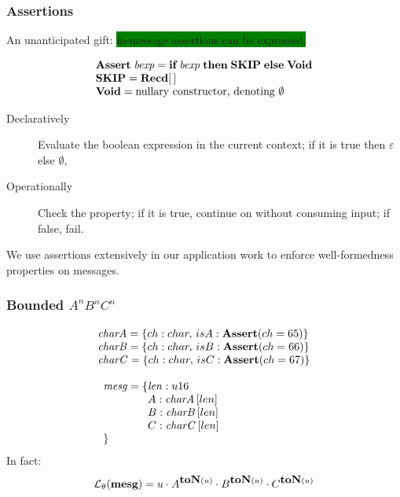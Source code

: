 \documentclass{beamer}
\newcommand{\gemph}[1]{\colorbox{green}{#1}}
\newcommand{\konst}[1]{\ensuremath{\mbox{\bf{#1}}}}
\newcommand{\LangTheta}[1]{\ensuremath{{\mathcal L}_{\theta}({#1})}}
\begin{document}
\begin{frame}\frametitle{Assertions}

An unanticipated gift: \gemph{in-message assertions can be expressed.}

\[
\begin{array}{l}
\konst{Assert}\;\mathit{bexp}  =
\konst{if}\; \mathit{bexp}\; \konst{then}\; \konst{SKIP} \;\konst{else}\;\konst{Void} \\
\konst{SKIP} = \konst{Recd} [\, ] \\
\konst{Void} = \text{nullary constructor, denoting } \emptyset
\end{array}
\]

\begin{description}
\item [Declaratively] Evaluate the boolean expression in the current context;
  if it is true then $\varepsilon$ else $\emptyset$,

\item [Operationally] Check the property; if it is true, continue on
  without consuming input; if false, fail.
\end{description}


We use assertions extensively in our application work to enforce
well-formedness properties on messages.

\end{frame}

\begin{frame}[fragile]\frametitle{Bounded $A^n B^n C^n$}

\[
\begin{array}{l}
  \mathit{charA} = \{ch : char, \,isA : \konst{Assert} (ch = 65)\} \\
  \mathit{charB} = \{ch : char, \,isB : \konst{Assert} (ch = 66)\} \\
  \mathit{charC} = \{ch : char, \,isC : \konst{Assert} (ch = 67)\} \\
\\
\begin{array}{l}
\mathit{mesg} = \{\mathit{len} : u16 \\
\phantom{\mathit{mesg} = \{} A : \mathit{charA}\, [len] \\
\phantom{\mathit{mesg} = \{} B : \mathit{charB}\, [len] \\
\phantom{\mathit{mesg} = \{} C : \mathit{charC}\, [len] \\
  \}
\end{array}
\end{array}
\]
%
In fact:
%
\[ \LangTheta{\konst{mesg}} = u \cdot A^{\konst{toN}(u)} \cdot
B^{\konst{toN}(u)} \cdot C^{\konst{toN}(u)} \]


\end{frame}
\end{document}
